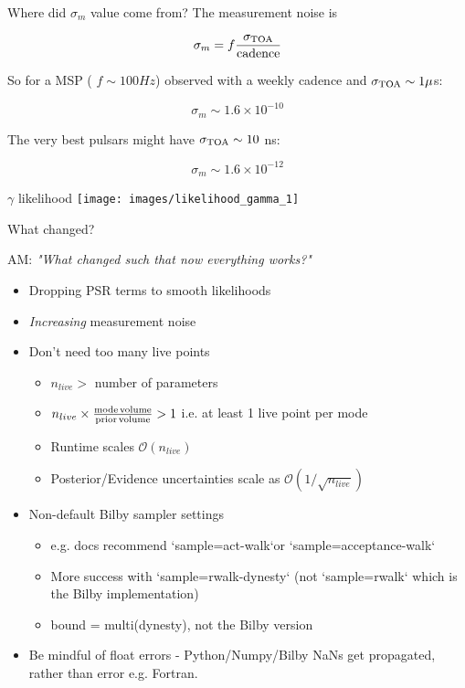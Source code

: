 \documentclass[10pt]{beamer}
\begin{document}
\begin{frame}[fragile]{Where did $\sigma_m$ value come from?}
The measurement noise is

$$ \sigma_m = f \frac{\sigma_{\rm TOA}}{\rm cadence}$$

So for a MSP ( $f \sim 100 Hz$) observed with a weekly cadence and $\sigma_{\rm TOA} \sim 1 \mu$s:


$$\sigma_m \sim 1.6 \times 10^{-10}$$

The very best pulsars might have $\sigma_{\rm TOA} \sim 10$ ns:

$$\sigma_m \sim 1.6 \times 10^{-12}$$
\end{frame}







\begin{frame}{$\gamma$ likelihood}
	\texttt{[image: images/likelihood\_gamma\_1]}
\end{frame}


	\begin{frame}{What changed?}
		
		AM: \textit{"What changed such that now everything works?"}
		
		\begin{itemize}
			\item Dropping PSR terms to smooth likelihoods
			\item \textit{Increasing} measurement noise  
			\item Don't need too many live points
			\begin{itemize}
				\item $n_{live} > $ number of parameters 
				\item $n_{live} \times \frac{\rm mode \, volume}{\rm prior \, volume} > 1 $ i.e. at least 1 live point per mode
				\item Runtime scales $\mathcal{O}(n_{live})$
				\item Posterior/Evidence uncertainties scale as $\mathcal{O}(1 / \sqrt{n_{live}})$
			\end{itemize}
			
			\item Non-default Bilby sampler settings 
			\begin{itemize}
				\item e.g. docs recommend `sample=act-walk`or `sample=acceptance-walk`
				\item More success with `sample=rwalk-dynesty` (not `sample=rwalk` which is the Bilby implementation)
				\item bound = multi(dynesty), not the Bilby version 
			\end{itemize}
		\item Be mindful of float errors - Python/Numpy/Bilby NaNs get propagated, rather than error e.g. Fortran.
		\end{itemize}
	

	
\end{frame}
\end{document}
